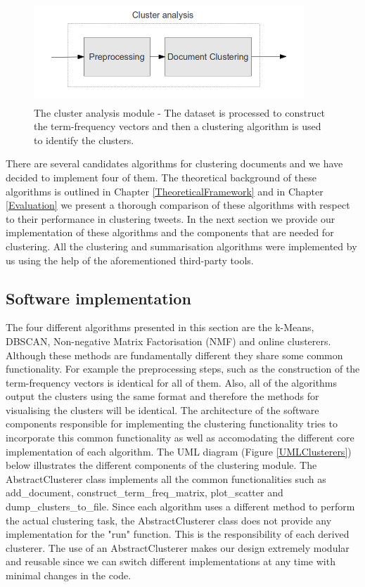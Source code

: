 \begin{figure}[htbp]
  \begin{center}
    \includegraphics[height=1.5in, width=4in]{clustering-overview}
    \caption{The cluster analysis module - The dataset is processed to construct the term-frequency vectors and then a clustering algorithm is used to identify the clusters.}
    \label{ClusteringOverview}
  \end{center}
\end{figure} 

\noindent There are several candidates algorithms for clustering documents and we have decided to implement four of them. The theoretical background of these algorithms is outlined in Chapter \ref{TheoreticalFramework} and in Chapter \ref{Evaluation} we present a thorough comparison of these algorithms with respect to their performance in clustering tweets.  
In the next section we provide our implementation of these algorithms and the components that are needed for clustering. All the clustering and summarisation algorithms were implemented by us using the help of the aforementioned third-party tools.  

\subsection{Software implementation}
The four different algorithms presented in this section are the k-Means, DBSCAN, Non-negative Matrix Factorisation (NMF) and online clusterers. Although these methods are fundamentally different they share some common functionality. For example the preprocessing steps, such as the construction of the term-frequency vectors is identical for all of them. Also, all of the algorithms output the clusters using the same format and therefore the methods for visualising the clusters will be identical. The architecture of the software components responsible for implementing the clustering functionality tries to incorporate this common functionality as well as accomodating the different core implementation of each algorithm. The UML diagram (Figure \ref{UMLClusterers}) below illustrates the different components of the clustering module. The AbstractClusterer class implements all the common functionalities such as add\_document, construct\_term\_freq\_matrix, plot\_scatter and dump\_clusters\_to\_file. Since each algorithm uses a different method to perform the actual clustering task, the AbstractClusterer class does not provide any implementation for the "run" function. This is the responsibility of each derived clusterer. The use of an AbstractClusterer makes our design extremely modular and reusable since we can switch different implementations at any time with minimal changes in the code.

